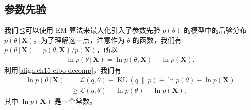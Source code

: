 \documentclass[../../main.tex]{subfiles}
\begin{document}
\subsection{参数先验}\label{subsection:ch15-参数先验}

我们也可以使用 EM 算法来最大化引入了参数先验 $p(\theta)$ 的模型中的后验分布 $p(\theta\,|\,\bm{X})$。为了理解这一点，注意作为 $\theta$ 的函数，我们有 $p(\theta\,|\,\bm{X})=p(\theta,\bm{X})/p(\bm{X})$，所以
\begin{align}
\ln p(\theta\,|\,\bm{X})=\ln p(\theta,\bm{X})-\ln p(\bm{X}).
\label{align:ch15-map}
\end{align}
利用\eqref{align:ch15-elbo-decomp}，我们有
\begin{align}
\ln p(\theta\,|\,\bm{X})
&=\mathcal{L}(q,\theta)+\operatorname{KL}(q\,\|\,p)+\ln p(\theta)-\ln p(\bm{X})\nonumber\\
&\geqslant\mathcal{L}(q,\theta)+\ln p(\theta)-\ln p(\bm{X}),
\label{align:ch15-map-elbo}
\end{align}
其中 $\ln p(\bm{X})$ 是一个常数。
\end{document}
